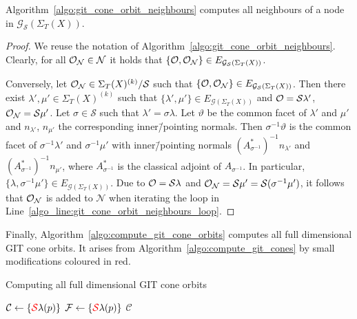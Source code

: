 \begin{prop}
	Algorithm~\ref{algo:git_cone_orbit_neighbours} computes all neighbours of a node in $\mathcal{G}_\mathcal{S}(\Sigma_T(X))$.
\end{prop}
\begin{proof}
	We reuse the notation of Algorithm~\ref{algo:git_cone_orbit_neighbours}. Clearly, for all  $\mathcal{O}_\mathcal{N}\in\mathcal{N}$ it holds that $\{\mathcal{O},\mathcal{O}_\mathcal{N}\}\in E_{\mathcal{G}_\mathcal{S}(\Sigma_T(X))}$.
	
	Conversely, let $\mathcal{O}_\mathcal{N}\in\Sigma_T(X)^{(k)}/\mathcal{S}$ such that $\{\mathcal{O},\mathcal{O}_\mathcal{N}\}\in E_{\mathcal{G}_\mathcal{S}(\Sigma_T(X))}$. Then there exist $\lambda',\mu'\in\Sigma_T(X)^{(k)}$ such that $\{\lambda', \mu'\}\in E_{\mathcal{G}(\Sigma_T(X))}$ and $\mathcal{O} = \mathcal{S}\lambda'$, $\mathcal{O}_\mathcal{N} = \mathcal{S}\mu'$. Let $\sigma\in\mathcal{S}$ such that $\lambda' = \sigma\lambda$. Let $\vartheta$ be the common facet of $\lambda'$ and $\mu'$ and $n_{\lambda'}$, $n_{\mu'}$ the corresponding inner\=/pointing normals. Then $\sigma^{-1}\vartheta$ is the common facet of $\sigma^{-1}\lambda'$ and $\sigma^{-1}\mu'$ with inner\=/pointing normals $(A_{\sigma^{-1}}^*)^{-1} n_{\lambda'}$ and $(A_{\sigma^{-1}}^*)^{-1} n_{\mu'}$, where $A_{\sigma^{-1}}^*$ is the classical adjoint of $A_{\sigma^{-1}}$. In particular, $\{\lambda, \sigma^{-1}\mu'\}\in E_{\mathcal{G}(\Sigma_T(X))}$. Due to $\mathcal{O} = \mathcal{S}\lambda$ and $\mathcal{O}_\mathcal{N} = \mathcal{S}\mu' = \mathcal{S}(\sigma^{-1}\mu')$, it follows that $\mathcal{O}_\mathcal{N}$ is added to $\mathcal{N}$ when iterating the loop in Line~\ref{algo_line:git_cone_orbit_neighbours_loop}.
\end{proof}

Finally, Algorithm~\ref{algo:compute_git_cone_orbits} computes all full dimensional GIT cone orbits. It arises from Algorithm~\ref{algo:compute_git_cones} by small modifications coloured in red.

\begin{algorithm}
	\caption{Computing all full dimensional GIT cone orbits}
	\label{algo:compute_git_cone_orbits}
	
	\BlankLine
	$\mathcal{C} \leftarrow \{\textcolor{red}{\mathcal{S}}\lambda(p)\}$\;
	$\mathcal{F} \leftarrow \{\textcolor{red}{\mathcal{S}}\lambda(p)\}$\;
	\Return $\mathcal{C}$\;
\end{algorithm}

